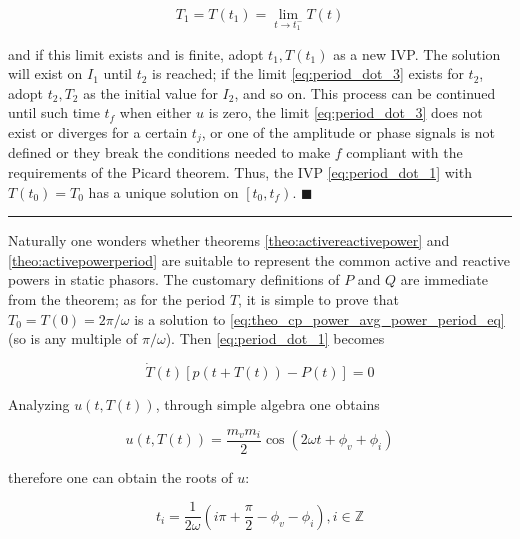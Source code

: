 \begin{equation} T_1 = T\left(t_1\right) = \lim\limits_{t\to t_1^-} T\left(t\right) \label{eq:period_dot_3} \end{equation}

	 and if this limit exists and is finite, adopt $t_1,T\left(t_1\right)$ as a new IVP. The solution will exist on $I_1$ until $t_2$ is reached; if the limit \eqref{eq:period_dot_3} exists for $t_2$, adopt $t_2,T_2$ as the initial value for $I_2$, and so on. This process can be continued until such time $t_f$ when either $u$ is zero, the limit \eqref{eq:period_dot_3} does not exist or diverges for a certain $t_j$, or one of the amplitude or phase signals is not defined or they break the conditions needed to make $f$ compliant with the requirements of the Picard theorem. Thus, the IVP \eqref{eq:period_dot_1} with $T\left(t_0\right) = T_0$ has a unique solution on $\left[t_0,t_f\right)$. \hfill$\blacksquare$
\vspace{5mm}
\hrule
\vspace{5mm} %

	Naturally one wonders whether theorems \ref{theo:activereactivepower} and \ref{theo:activepowerperiod} are suitable to represent the common active and reactive powers in static phasors. The customary definitions of $P$ and $Q$ are immediate from the theorem; as for the period $T$, it is simple to prove that $T_0 = T(0) = 2\pi/\omega$ is a solution to \eqref{eq:theo_cp_power_avg_power_period_eq} (so is any multiple of $\pi/\omega$). Then \eqref{eq:period_dot_1} becomes

\begin{equation} \dot{T}\left(t\right)\left[p\left(t+T\left(t\right)\right) - P\left(t\right)\right] = 0 \label{eq:period_dot_4} \end{equation}

	Analyzing $u\left(t,T\left(t\right)\right)$, through simple algebra one obtains

\begin{equation} u\left(t,T\left(t\right)\right) = \dfrac{m_vm_i}{2} \cos\left(2\omega t + \phi_v + \phi_i\right) \end{equation}

	therefore one can obtain the roots of $u$:

\begin{equation} t_i = \dfrac{1}{2\omega}\left(i\pi + \dfrac{\pi}{2} - \phi_v - \phi_i\right), i\in\mathbb{Z} \end{equation}

